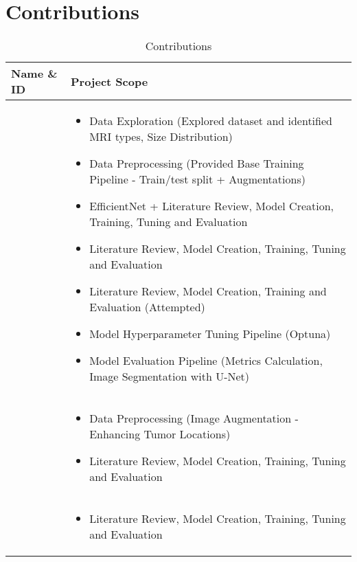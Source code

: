 \section{Contributions}\label{contribution}


\begin{longtable}{p{5cm}|p{9.5cm}}
  \caption{Contributions}
  \label{tab:contributions}
    \hline
    \textbf{Name} \& \textbf{ID} & \textbf{Project Scope}\\
    \hline

    \nameref{ss:wjw} &
        \begin{itemize}
            \item Data Exploration (Explored dataset and identified MRI types, Size Distribution)
            \item Data Preprocessing (Provided Base Training Pipeline - Train/test split + Augmentations)
            \item EfficientNet + \nameref{s:unet} Literature Review, Model Creation, Training, Tuning and Evaluation
            \item \nameref{s:inceptionv3} Literature Review, Model Creation, Training, Tuning and Evaluation
            \item \nameref{ss:vgg16} Literature Review, Model Creation, Training and Evaluation (Attempted)
            \item Model Hyperparameter Tuning Pipeline (Optuna)
            \item Model Evaluation Pipeline (Metrics Calculation, Image Segmentation with U-Net)
        \end{itemize}\\
        \hline

    \nameref{ss:blch} &
        \begin{itemize}
            \item Data Preprocessing (Image Augmentation - Enhancing Tumor Locations)
            \item \nameref{s:resnet50} Literature Review, Model Creation, Training, Tuning and Evaluation
        \end{itemize}\\
        \hline

    \nameref{ss:lhsj} &
        \begin{itemize}
            \item \nameref{s:vit} Literature Review, Model Creation, Training, Tuning and Evaluation
        \end{itemize}\\
        \hline
    

\end{longtable}
